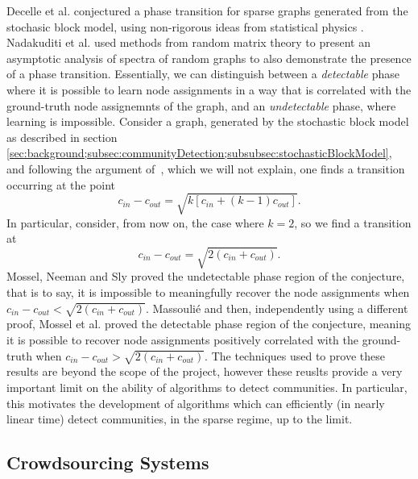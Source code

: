 \documentclass[12pt]{article}
\numberwithin{equation}{section}
\begin{document}
Decelle et al. \cite{DKM+11} conjectured a phase transition for sparse graphs generated from the stochasic block model, using non-rigorous ideas from statistical physics \cite{MNS12}. Nadakuditi et al. \cite{NN12} used methods from random matrix theory to present an asymptotic analysis of spectra of random graphs to also demonstrate the presence of a phase transition. Essentially, we can distinguish between a \textsl{detectable} phase where it is possible to learn node assignments in a way that is correlated with the ground-truth node assignemnts of the graph, and an \textsl{undetectable} phase, where learning is impossible. Consider a graph, generated by the stochastic block model as described in section \ref{sec:background;subsec:communityDetection;subsubsec:stochasticBlockModel}, and following the argument of~\cite{NN12}, which we will not explain, one finds a transition occurring at the point
\begin{equation}
\label{eq:phaseTransitionK}
	c_{in} - c_{out} = \sqrt{k[c_{in} + (k-1)c_{out}]}.
\end{equation}
In particular, consider, from now on, the case where $k = 2$, so we find a transition at
\begin{equation}
\label{eq:phaseTransitionK}
	c_{in} - c_{out} = \sqrt{2(c_{in} + c_{out})}.
\end{equation}
Mossel, Neeman and Sly \cite{MNS12} proved the undetectable phase region of the conjecture, that is to say, it is impossible to meaningfully recover the node assignments when $ c_{in} - c_{out} < \sqrt{2(c_{in} + c_{out})}$. Massouli\'e \cite{Mas13} and then, independently using a different proof, Mossel et al. \cite{MNS13b} proved the detectable phase region of the conjecture, meaning it is possible to recover node assignments positively correlated with the ground-truth when $ c_{in} - c_{out} > \sqrt{2(c_{in} + c_{out})}$. The techniques used to prove these results are beyond the scope of the project, however these reuslts provide a very important limit on the ability of algorithms to detect communities. In particular, this motivates the development of algorithms which can efficiently (in nearly linear time) detect communities, in the sparse regime, up to the limit.

\subsection{Crowdsourcing Systems}
\label{sec:background;subsec:crowdsourcingSystems}
\end{document}
